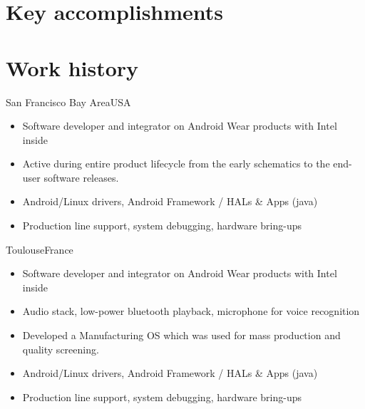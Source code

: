 \documentclass[a4paper,11pt,sans]{moderncv}
\begin{document}
\section{Key accomplishments}
\begin{cvcolumns}
\end{cvcolumns}
\begin{cvcolumns}
\end{cvcolumns}


\section{Work history}
{San Francisco Bay Area}{USA}
{%
  \begin{itemize}
  \item Software developer and integrator on Android Wear products with Intel inside
  \item Active during entire product lifecycle from the early schematics to the end-user software releases.
  \item Android/Linux drivers, Android Framework / HALs \& Apps (java)
  \item Production line support, system debugging, hardware bring-ups
  \end{itemize}
}

{Toulouse}{France}
{
    \begin{itemize}
    \item Software developer and integrator on Android Wear products with Intel inside
      \item Audio stack, low-power bluetooth playback, microphone for voice recognition
      \item Developed a Manufacturing OS which was used for mass production and quality screening.
      \item Android/Linux drivers, Android Framework / HALs \& Apps (java)
      \item Production line support, system debugging, hardware bring-ups
    \end{itemize}
}
\end{document}
